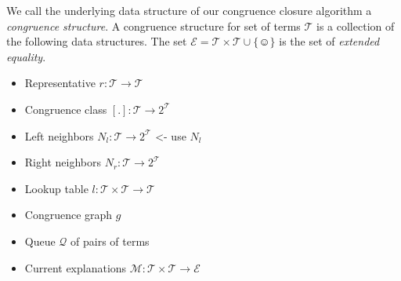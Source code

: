 We call the underlying data structure of our congruence closure algorithm a \emph{congruence structure}.
A congruence structure for set of terms $\mathcal{T}$ is a collection of the following data structures.
The set $\mathcal{E} = \mathcal{T} \times \mathcal{T} \cup \{\smiley\}$ is the set of \emph{extended equality}.

\begin{itemize}
	\item Representative $r: \mathcal{T} \rightarrow \mathcal{T}$
	\item Congruence class $[.]: \mathcal{T} \rightarrow 2^\mathcal{T}$
	\item Left neighbors $N_l: \mathcal{T} \rightarrow 2^\mathcal{T}$ <- use $N_l$
	\item Right neighbors $N_r: \mathcal{T} \rightarrow 2^\mathcal{T}$
	\item Lookup table $l: \mathcal{T} \times \mathcal{T} \rightarrow \mathcal{T}$
	\item Congruence graph $g$
	\item Queue $\mathcal{Q}$ of pairs of terms %
	\item Current explanations $\mathcal{M}: \mathcal{T} \times \mathcal{T} \rightarrow \mathcal{E}$
\end{itemize}

